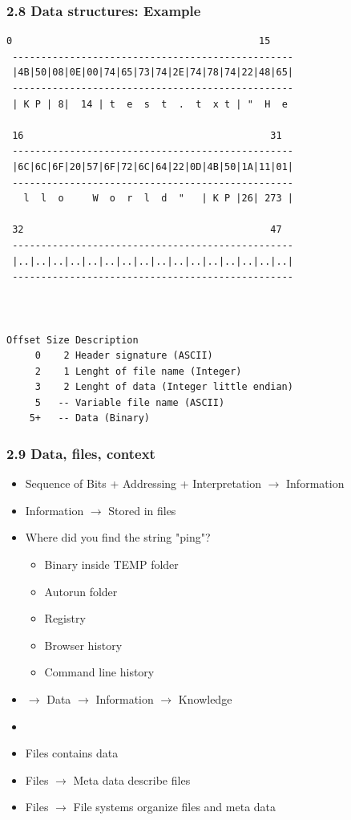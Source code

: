 \begin{frame}[fragile]
  \frametitle{2.8 Data structures: Example}
\begin{lstlisting}[basicstyle=\tiny]
  0                                           15
 -------------------------------------------------
 |4B|50|08|0E|00|74|65|73|74|2E|74|78|74|22|48|65|
 -------------------------------------------------
 | K P | 8|  14 | t  e  s  t  .  t  x t | "  H  e

 16                                           31
 -------------------------------------------------
 |6C|6C|6F|20|57|6F|72|6C|64|22|0D|4B|50|1A|11|01|
 -------------------------------------------------
   l  l  o     W  o  r  l  d  "   | K P |26| 273 |

 32                                           47
 -------------------------------------------------
 |..|..|..|..|..|..|..|..|..|..|..|..|..|..|..|..|
 -------------------------------------------------
 
 
 
Offset Size Description
     0    2 Header signature (ASCII)
     2    1 Lenght of file name (Integer)
     3    2 Lenght of data (Integer little endian)
     5   -- Variable file name (ASCII)
    5+   -- Data (Binary)
\end{lstlisting}
\end{frame}



\begin{frame}
  \frametitle{2.9 Data, files, context}
    \begin{itemize}
        \item Sequence of Bits + Addressing + Interpretation $\to$ Information
        \item Information $\to$ Stored in files
        \item Where did you find the string "ping"?
            \begin{itemize}
                \item Binary inside TEMP folder
                \item Autorun folder
                \item Registry
                \item Browser history
                \item Command line history
            \end{itemize}
        \item [] $\to$ Data $\to$ Information $\to$ Knowledge
	\item[] 
	\item Files contains data
	\item Files $\to$ Meta data describe files
        \item Files $\to$ File systems organize files and meta data
    \end{itemize}
\end{frame}









